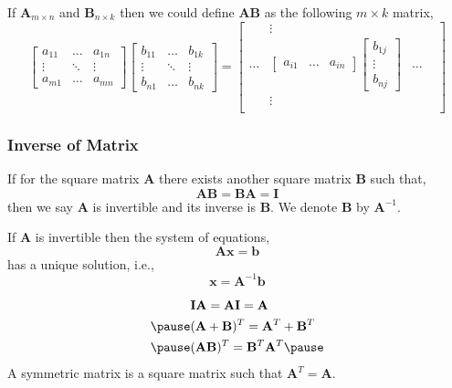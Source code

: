 \documentclass[12pt,aspectratio=169]{beamer}
\begin{document}
\begin{frame}
If $\mathbf{A}_{m\times n}$ and $\mathbf{B}_{n\times k}$ then we could define $\mathbf{AB}$ as the following $m\times k$ matrix,
\[
\begin{bmatrix}
a_{11} & \dots & a_{1n}\\
\vdots & \ddots & \vdots\\
a_{m1} & \dots & a_{mn}
\end{bmatrix}
\begin{bmatrix}
b_{11} & \dots & b_{1k}\\
\vdots & \ddots & \vdots\\
b_{n1} & \dots & b_{nk}
\end{bmatrix}=
\begin{bmatrix}
 & \vdots & \\
\dots &
\begin{bmatrix}
a_{i1} & \dots & a_{in}
\end{bmatrix}
\begin{bmatrix}
b_{1j}\\
\vdots\\
b_{nj}
\end{bmatrix} & \dots & \\
 & \vdots & \\
\end{bmatrix}
\]
\end{frame}

\begin{frame}
\frametitle{Inverse of Matrix}
If for the square matrix $\mathbf{A}$ there exists another square matrix $\mathbf{B}$ such that,
\[
\mathbf{AB}=\mathbf{BA}=\mathbf{I}
\]
then we say $\mathbf{A}$ is invertible and its inverse is $\mathbf{B}$. We denote $\mathbf{B}$ by $\mathbf{A}^{-1}$.
\end{frame}

\begin{frame}
If $\mathbf{A}$ is invertible then the system of equations,
\[
\mathbf{Ax}=\mathbf{b}
\]
has a unique solution, i.e.,
\[
\mathbf{x}=\mathbf{A}^{-1}\mathbf{b}
\]
\end{frame}

\begin{frame}
\[
\begin{aligned}
& \mathbf{IA}=\mathbf{AI}=\mathbf{A}\\ \pause
& (\mathbf{A}+\mathbf{B})^T=\mathbf{A}^T+\mathbf{B}^T \\ \pause
& (\mathbf{AB})^T=\mathbf{B}^T\mathbf{A}^T \pause
\end{aligned}
\]
A symmetric matrix is a square matrix such that $\mathbf{A}^T=\mathbf{A}$.
\end{frame}
\end{document}

